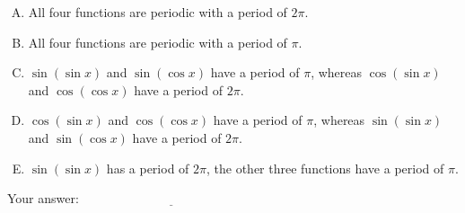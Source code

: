 \documentclass[10pt]{amsart}
\begin{document}
\begin{enumerate}
  \begin{enumerate}[(A)]
  \item All four functions are periodic with a period of $2\pi$.
  \item All four functions are periodic with a period of $\pi$.
  \item $\sin(\sin x)$ and $\sin(\cos x)$ have a period of $\pi$,
    whereas $\cos(\sin x)$ and $\cos(\cos x)$ have a period of $2\pi$.
  \item $\cos(\sin x)$ and $\cos(\cos x)$ have a period of $\pi$,
    whereas $\sin(\sin x)$ and $\sin(\cos x)$ have a period of $2\pi$.
  \item $\sin(\sin x)$ has a period of $2\pi$, the other three
    functions have a period of $\pi$.
  \end{enumerate}
  
  \vspace{0.05in}
  Your answer: $\underline{\qquad\qquad\qquad\qquad\qquad\qquad\qquad}$
  \vspace{0.05in}
\end{enumerate}
\end{document}
